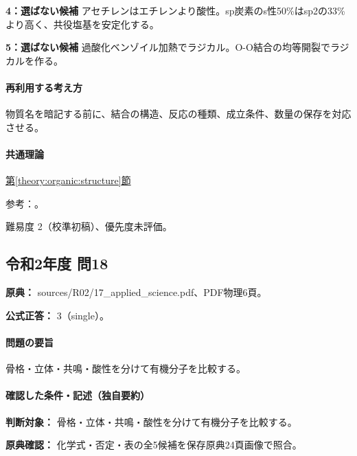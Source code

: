 \noindent\textbf{4：選ばない候補} アセチレンはエチレンより酸性。sp炭素のs性50\%はsp2の33\%より高く、共役塩基を安定化する。\par

\noindent\textbf{5：選ばない候補} 過酸化ベンゾイル加熱でラジカル。O-O結合の均等開裂でラジカルを作る。\par

\paragraph{再利用する考え方} 物質名を暗記する前に、結合の構造、反応の種類、成立条件、数量の保存を対応させる。

\paragraph{共通理論} \hyperref[theory:organic:structure]{第\ref*{theory:organic:structure}節}

\par 参考：\cite{organic_chirality,organic_benzene}。

\par 難易度 2（校準初稿）、優先度未評価。

\subsection{令和2年度 問18}
\label{q:r02-reg-applied-18}

\noindent\textbf{原典：} sources/R02/17\_applied\_science.pdf、PDF物理6頁。

\textbf{公式正答：} 3（single）。

\paragraph{問題の要旨} 骨格・立体・共鳴・酸性を分けて有機分子を比較する。

\paragraph{確認した条件・記述（独自要約）}\mbox{}\par

\noindent\textbf{判断対象：} 骨格・立体・共鳴・酸性を分けて有機分子を比較する。\par

\noindent\textbf{原典確認：} 化学式・否定・表の全5候補を保存原典24頁画像で照合。\par

